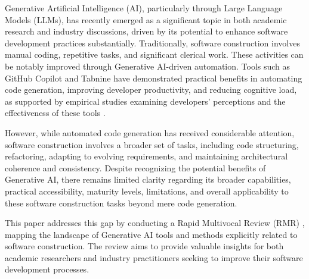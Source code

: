 Generative Artificial Intelligence (AI), particularly through Large Language Models (LLMs), has recently emerged as a significant topic in both academic research and industry discussions, driven by its potential to enhance software development practices substantially. Traditionally, software construction involves manual coding, repetitive tasks, and significant clerical work. These activities can be notably improved through Generative AI-driven automation. Tools such as GitHub Copilot and Tabnine have demonstrated practical benefits in automating code generation, improving developer productivity, and reducing cognitive load, as supported by empirical studies examining developers' perceptions and the effectiveness of these tools \cite{sergeyuk2025using}.

However, while automated code generation has received considerable attention, software construction involves a broader set of tasks, including code structuring, refactoring, adapting to evolving requirements, and maintaining architectural coherence and consistency. Despite recognizing the potential benefits of Generative AI, there remains limited clarity regarding its broader capabilities, practical accessibility, maturity levels, limitations, and overall applicability to these software construction tasks beyond mere code generation.

This paper addresses this gap by conducting a Rapid Multivocal Review (RMR) \cite{rocha2025metaprotocol}, mapping the landscape of Generative AI tools and methods explicitly related to software construction. The review aims to provide valuable insights for both academic researchers and industry practitioners seeking to improve their software development processes.